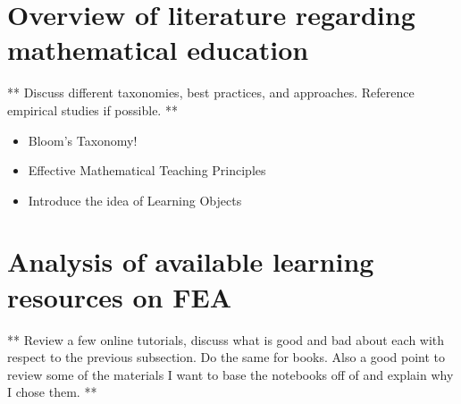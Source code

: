 \section{Overview of literature regarding mathematical education}

** Discuss different taxonomies, best practices, and approaches. Reference empirical studies if possible. **

\begin{itemize}
	\item Bloom's Taxonomy!
	\item Effective Mathematical Teaching Principles
	\item Introduce the idea of Learning Objects
\end{itemize}



\section{Analysis of available learning resources on FEA}

** Review a few online tutorials, discuss what is good and bad about each with respect to the previous subsection. Do the same for books. Also a good point to review some of the materials I want to base the notebooks off of and explain why I chose them. **
